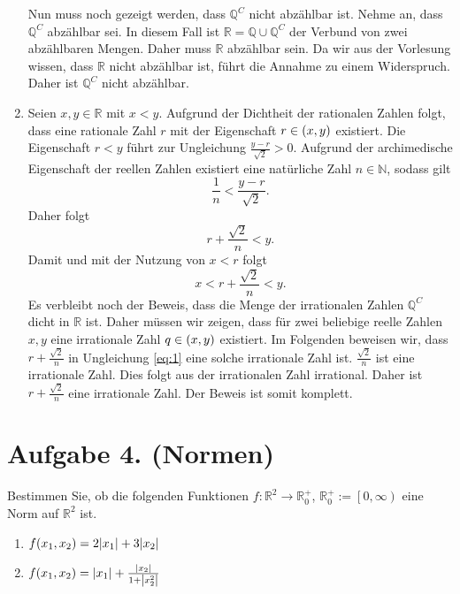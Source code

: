 \documentclass[german,12pt]{homework}
\newcommand{\NN}{\mathbb{N}}
\newcommand{\QQ}{\mathbb{Q}}
\newcommand{\RR}{\mathbb{R}}
\DeclarePairedDelimiter{\absolute}{\lvert}{\rvert}
\DeclarePairedDelimiter{\enbrace}{(}{)}
\begin{document}
\begin{enumerate}
        Nun muss noch gezeigt werden, dass \(\QQ^C\) nicht abzählbar ist. Nehme
        an, dass \(\QQ^C\) abzählbar sei. In diesem Fall ist \(\RR = \QQ \cup
        \QQ^C\) der Verbund von zwei abzählbaren Mengen. Daher muss \(\RR\)
        abzählbar sein. Da wir aus der Vorlesung wissen, dass \(\RR\) nicht
        abzählbar ist, führt die Annahme zu einem Widerspruch. Daher ist
        \(\QQ^C\) nicht abzählbar.
        \item Seien \(x, y \in \RR\) mit \(x < y\). Aufgrund der Dichtheit der
        rationalen Zahlen folgt, dass eine rationale Zahl \(r\) mit der
        Eigenschaft \(r \in \enbrace*{x, y}\) existiert. Die Eigenschaft \(r <
        y\) führt zur Ungleichung \(\frac{y - r}{\sqrt{2}} > 0\). Aufgrund der
        archimedische Eigenschaft der reellen Zahlen existiert eine natürliche
        Zahl \(n \in \NN\), sodass gilt
        \[\frac{1}{n} < \frac{y - r}{\sqrt{2}}.\]
        Daher folgt
        \[r + \frac{\sqrt{2}}{n} < y.\]
        Damit und mit der Nutzung von \(x < r\) folgt
        \begin{equation}\label{eq:1}
            x < r + \frac{\sqrt{2}}{n} < y.
        \end{equation}
        Es verbleibt noch der Beweis, dass die Menge der irrationalen Zahlen
        \(\QQ^C\) dicht in \(\RR\) ist. Daher müssen wir zeigen, dass für zwei
        beliebige reelle Zahlen \(x, y\) eine irrationale Zahl \(q \in
        \enbrace*{x, y}\) existiert. Im Folgenden beweisen wir, dass \(r +
        \frac{\sqrt{2}}{n}\) in Ungleichung \eqref{eq:1} eine solche
        irrationale Zahl ist. \(\frac{\sqrt{2}}{n}\) ist eine irrationale Zahl.
        Dies folgt aus der irrationalen Zahl irrational. Daher ist \(r +
        \frac{\sqrt{2}}{n}\) eine irrationale Zahl. Der Beweis ist somit
        komplett.
    \end{enumerate}

    \section*{Aufgabe 4. (Normen)}

    \begin{problem}
        Bestimmen Sie, ob die folgenden Funktionen \(f: \RR^2 \to \RR_0^+\),
        \(\RR_0^+ := \left[0, \infty\right)\) eine Norm auf \(\RR^2\) ist.
        \begin{enumerate}
            \item \(f\enbrace*{x_1, x_2} = 2\absolute*{x_1} + 3\absolute*{x_2}\)
            \item \(f\enbrace*{x_1, x_2} = \absolute*{x_1} +
            \frac{\absolute*{x_2}}{1 + \absolute*{x_2^2}}\)
        \end{enumerate}
    \end{problem}
\end{document}
